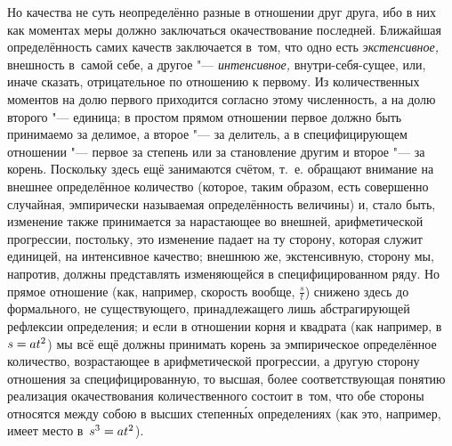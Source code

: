 Но качества не суть неопределённо разные в отношении друг друга, ибо в них как
моментах меры должно заключаться окачествование последней. Ближайшая
определённость самих качеств заключается в~том, что одно есть
{\em экстенсивное,} внешность в~самой себе, а другое "--- {\em интенсивное,}
внутри-себя-сущее, или, иначе сказать, отрицательное по отношению к первому. Из
количественных моментов на долю первого приходится согласно этому численность,
а на долю второго "--- единица; в простом прямом отношении первое должно быть
принимаемо за делимое, а второе "--- за делитель, а в специфицирующем отношении
"--- первое за степень или за становление другим и второе "--- за корень.
Поскольку здесь ещё занимаются счётом, т.~е. обращают внимание на внешнее
определённое количество (которое, таким образом, есть совершенно случайная,
эмпирически называемая определённость величины) и, стало быть, изменение также
принимается за нарастающее во внешней, арифметической прогрессии, постольку,
это изменение падает на ту сторону, которая служит единицей, на интенсивное
качество; внешнюю же, экстенсивную, сторону мы, напротив, должны представлять
изменяющейся в специфицированном ряду. Но прямое отношение (как, например,
скорость вообще, $\frac s t$) снижено здесь до формального, не существующего,
принадлежащего лишь абстрагирующей рефлексии определения; и если в отношении
корня и квадрата (как например, в $s\hm=at^2$) мы всё ещё должны принимать
корень за эмпирическое определённое количество, возрастающее в арифметической
прогрессии, а другую сторону отношения за специфицированную, то высшая, более
соответствующая понятию реализация окачествования количественного состоит
в~том, что обе стороны относятся между собою в высших степенн\'{ы}х
определениях (как это, например, имеет место в~$s^3\hm=at^2$).

\subsubsection[Примечание]{}


